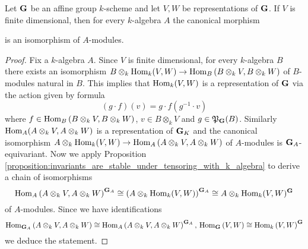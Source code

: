 \begin{proposition}\label{proposition:base_change_for_hom_of_representations_of_affine_group_schemes}
Let $\mathbf{G}$ be an affine group $k$-scheme and let $V,W$ be representations of $\mathbf{G}$. If $V$ is finite dimensional, then for every $k$-algebra $A$ the canonical morphism
\begin{center}
\end{center}
is an isomorphism of $A$-modules.
\end{proposition}
\begin{proof}
Fix a $k$-algebra $A$. Since $V$ is finite dimensional, for every $k$-algebra $B$ there exists an isomorphism $B\otimes_k\mathrm{Hom}_{k}(V,W) \rightarrow \mathrm{Hom}_{B}\left(B\otimes_kV,B \otimes_kW\right)$ of $B$-modules natural in $B$. This implies that $\mathrm{Hom}_k(V,W)$ is a representation of $\mathbf{G}$ via the action given by formula
$$\left(g\cdot f\right)(v) = g\cdot f(g^{-1}\cdot v)$$
where $f\in \mathrm{Hom}_{B}\left(B\otimes_kV,B \otimes_kW\right)$, $v\in B\otimes_kV$ and $g\in {\mathfrak P}_{\mathbf{G}}(B)$. Similarly $\mathrm{Hom}_A(A\otimes_kV,A\otimes_kW)$ is a representation of $\mathbf{G}_K$ and the canonical isomorphism $A\otimes_k\mathrm{Hom}_{k}(V,W) \rightarrow \mathrm{Hom}_{A}\left(A\otimes_kV,A \otimes_kW\right)$ of $A$-modules is $\mathbf{G}_A$-equivariant. Now we apply Proposition \ref{proposition:invariants_are_stable_under_tensoring_with_k_algebra} to derive a chain of isomorphisms
$$\mathrm{Hom}_{A}\left(A\otimes_kV,A\otimes_kW\right)^{\mathbf{G}_A} \cong \left(A\otimes_k\mathrm{Hom}_{k}(V,W)\right)^{\mathbf{G}_A} \cong A\otimes_k\mathrm{Hom}_k(V,W)^{\mathbf{G}}$$
of $A$-modules. Since we have identifications
$$\mathrm{Hom}_{\mathbf{G}_A}\left(A\otimes_kV,A\otimes_kW\right) \cong \mathrm{Hom}_{A}\left(A\otimes_kV,A\otimes_kW\right)^{\mathbf{G}_A} ,\,\mathrm{Hom}_{\mathbf{G}}\left(V,W\right)  \cong \mathrm{Hom}_k\left(V,W\right)^{\mathbf{G}}$$
we deduce the statement.
\end{proof}

